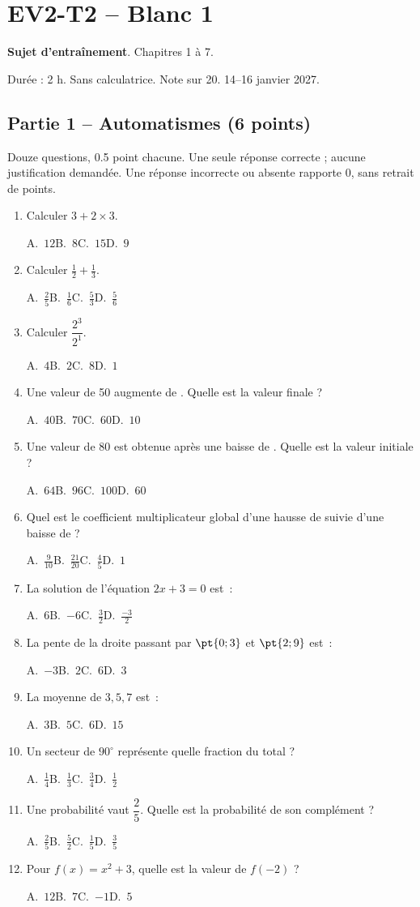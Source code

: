 \mxnewpage\section*{EV2-T2 -- Blanc 1}\label{EV2-T2}
\textbf{Sujet d’entraînement}. Chapitres 1 à 7.\par Durée : 2 h. Sans calculatrice. Note sur 20. 14–16 janvier 2027.
\subsection*{Partie 1 -- Automatismes (6 points)}
Douze questions, \num{0,5} point chacune. Une seule réponse correcte ; aucune justification demandée. Une réponse incorrecte ou absente rapporte 0, sans retrait de points.
\begin{enumerate}
\item Calculer $3+2\times3$.\par A.~$12$\quad B.~$8$\quad C.~$15$\quad D.~$9$
\item Calculer $\frac12+\frac13$.\par A.~$\frac{2}{5}$\quad B.~$\frac{1}{6}$\quad C.~$\frac{5}{3}$\quad D.~$\frac{5}{6}$
\item Calculer $\dfrac{2^3}{2^{1}}$.\par A.~$4$\quad B.~$2$\quad C.~$8$\quad D.~$1$
\item Une valeur de 50 augmente de . Quelle est la valeur finale ?\par A.~$40$\quad B.~$70$\quad C.~$60$\quad D.~$10$
\item Une valeur de 80 est obtenue après une baisse de . Quelle est la valeur initiale ?\par A.~$64$\quad B.~$96$\quad C.~$100$\quad D.~$60$
\item Quel est le coefficient multiplicateur global d'une hausse de  suivie d'une baisse de  ?\par A.~$\frac{9}{10}$\quad B.~$\frac{21}{20}$\quad C.~$\frac{4}{5}$\quad D.~$1$
\item La solution de l'équation $2x+3=0$ est~:\par A.~$6$\quad B.~$-6$\quad C.~$\frac{3}{2}$\quad D.~$\frac{-3}{2}$
\item La pente de la droite passant par $\pt{0;3}$ et $\pt{2;9}$ est~:\par A.~$-3$\quad B.~$2$\quad C.~$6$\quad D.~$3$
\item La moyenne de $3, 5, 7$ est~:\par A.~$3$\quad B.~$5$\quad C.~$6$\quad D.~$15$
\item Un secteur de $90^\circ$ représente quelle fraction du total ?\par A.~$\frac{1}{4}$\quad B.~$\frac{1}{3}$\quad C.~$\frac{3}{4}$\quad D.~$\frac{1}{2}$
\item Une probabilité vaut $\dfrac{2}{5}$. Quelle est la probabilité de son complément ?\par A.~$\frac{2}{5}$\quad B.~$\frac{5}{2}$\quad C.~$\frac{1}{5}$\quad D.~$\frac{3}{5}$
\item Pour $f(x)=x^2+3$, quelle est la valeur de $f(-2)$ ?\par A.~$12$\quad B.~$7$\quad C.~$-1$\quad D.~$5$
\end{enumerate}
